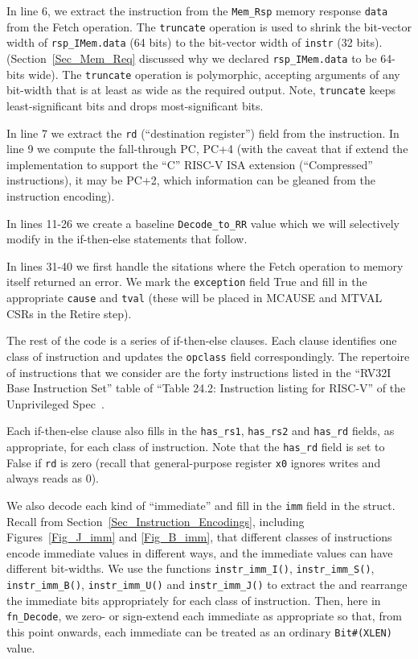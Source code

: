 


In line 6, we extract the instruction from the \verb|Mem_Rsp| memory
response \verb|data| from the Fetch operation. The \verb|truncate|
operation is used to shrink the bit-vector width of
\verb|rsp_IMem.data| (64 bits) to the bit-vector width of \verb|instr|
(32 bits).  (Section~\ref{Sec_Mem_Req} discussed why we declared
\verb|rsp_IMem.data| to be 64-bits wide).  The \verb|truncate|
operation is polymorphic, accepting arguments of any bit-width that is
at least as wide as the required output.  Note, \verb|truncate| keeps
least-significant bits and drops most-significant bits.

In line 7 we extract the \verb|rd| (``destination register'') field
from the instruction.  In line 9 we compute the fall-through PC, PC+4
(with the caveat that if extend the implementation to support the
``C'' RISC-V ISA extension (``Compressed'' instructions), it may be
PC+2, which information can be gleaned from the instruction encoding).

In lines 11-26 we create a baseline \verb|Decode_to_RR| value which we
will selectively modify in the if-then-else statements that follow.

In lines 31-40 we first handle the sitations where the Fetch operation
to memory itself returned an error.  We mark the \verb|exception|
field True and fill in the appropriate \verb|cause| and \verb|tval|
(these will be placed in MCAUSE and MTVAL CSRs in the Retire step).

The rest of the code is a series of if-then-else clauses. Each clause
identifies one class of instruction and updates the \verb|opclass|
field correspondingly.  The repertoire of instructions that we
consider are the forty instructions listed in the ``RV32I Base
Instruction Set'' table of ``Table 24.2: Instruction listing for
RISC-V'' of the Unprivileged Spec~\cite{RISCV_Unpriv_2019_12_13}.

Each if-then-else clause also fills in the \verb|has_rs1|,
\verb|has_rs2| and \verb|has_rd| fields, as appropriate, for each
class of instruction.  Note that the \verb|has_rd| field is set to
False if \verb|rd| is zero (recall that general-purpose register
\verb|x0| ignores writes and always reads as 0).

We also decode each kind of ``immediate'' and fill in the \verb|imm|
field in the struct.  Recall from
Section~\ref{Sec_Instruction_Encodings}, including
Figures~\ref{Fig_J_imm} and \ref{Fig_B_imm}, that different classes of
instructions encode immediate values in different ways, and the
immediate values can have different bit-widths.  We use the functions
\verb|instr_imm_I()|, \verb|instr_imm_S()|, \verb|instr_imm_B()|,
\verb|instr_imm_U()| and \verb|instr_imm_J()| to extract the and
rearrange the immediate bits appropriately for each class of
instruction.  Then, here in \verb|fn_Decode|, we zero- or sign-extend
each immediate as appropriate so that, from this point onwards, each
immediate can be treated as an ordinary \verb|Bit#(XLEN)| value.

